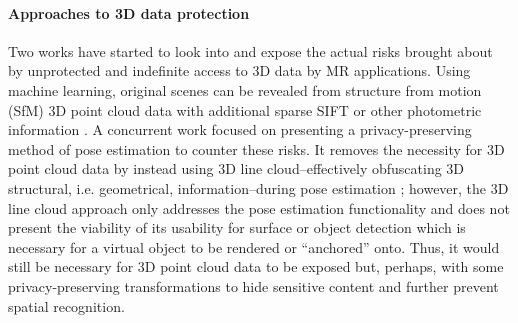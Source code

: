 
\paragraph{Approaches to 3D data protection}\label{rrw:3d}
Two works have started to look into and expose the actual risks brought about by unprotected and indefinite access to 3D data by MR applications. Using machine learning, original scenes can be revealed from structure from motion (SfM) 3D point cloud data with additional sparse SIFT or other photometric information \cite{pittaluga2019revealing}. A concurrent work focused on presenting a privacy-preserving method of pose estimation to counter these risks. It removes the necessity for 3D point cloud data by instead using 3D line cloud--effectively obfuscating 3D structural, i.e. geometrical, information--during pose estimation \cite{speciale2019privacy}; however, the 3D line cloud approach only addresses the pose estimation functionality and does not present the viability of its usability for surface or object detection which is necessary for a virtual object to be rendered or ``anchored'' onto. Thus, it would still be necessary for 3D point cloud data to be exposed but, perhaps, with some privacy-preserving transformations to hide sensitive content and further prevent spatial recognition. %

